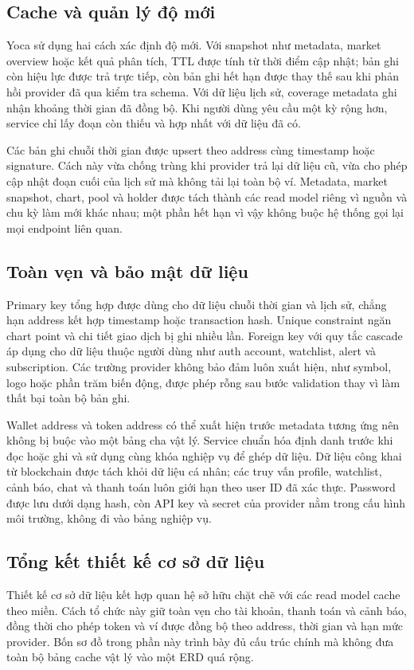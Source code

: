 \subsection{Cache và quản lý độ mới}
\label{subsec:db_cache}

Yoca sử dụng hai cách xác định độ mới. Với snapshot như metadata, market overview hoặc kết quả phân tích, TTL được tính từ thời điểm cập nhật; bản ghi còn hiệu lực được trả trực tiếp, còn bản ghi hết hạn được thay thế sau khi phản hồi provider đã qua kiểm tra schema. Với dữ liệu lịch sử, coverage metadata ghi nhận khoảng thời gian đã đồng bộ. Khi người dùng yêu cầu một kỳ rộng hơn, service chỉ lấy đoạn còn thiếu và hợp nhất với dữ liệu đã có.

Các bản ghi chuỗi thời gian được upsert theo address cùng timestamp hoặc signature. Cách này vừa chống trùng khi provider trả lại dữ liệu cũ, vừa cho phép cập nhật đoạn cuối của lịch sử mà không tải lại toàn bộ ví. Metadata, market snapshot, chart, pool và holder được tách thành các read model riêng vì nguồn và chu kỳ làm mới khác nhau; một phần hết hạn vì vậy không buộc hệ thống gọi lại mọi endpoint liên quan.

\subsection{Toàn vẹn và bảo mật dữ liệu}
\label{subsec:db_toan_ven}

Primary key tổng hợp được dùng cho dữ liệu chuỗi thời gian và lịch sử, chẳng hạn address kết hợp timestamp hoặc transaction hash. Unique constraint ngăn chart point và chi tiết giao dịch bị ghi nhiều lần. Foreign key với quy tắc cascade áp dụng cho dữ liệu thuộc người dùng như auth account, watchlist, alert và subscription. Các trường provider không bảo đảm luôn xuất hiện, như symbol, logo hoặc phần trăm biến động, được phép rỗng sau bước validation thay vì làm thất bại toàn bộ bản ghi.

Wallet address và token address có thể xuất hiện trước metadata tương ứng nên không bị buộc vào một bảng cha vật lý. Service chuẩn hóa định danh trước khi đọc hoặc ghi và sử dụng cùng khóa nghiệp vụ để ghép dữ liệu. Dữ liệu công khai từ blockchain được tách khỏi dữ liệu cá nhân; các truy vấn profile, watchlist, cảnh báo, chat và thanh toán luôn giới hạn theo user ID đã xác thực. Password được lưu dưới dạng hash, còn API key và secret của provider nằm trong cấu hình môi trường, không đi vào bảng nghiệp vụ.


\subsection{Tổng kết thiết kế cơ sở dữ liệu}
\label{subsec:db_tong_ket}

Thiết kế cơ sở dữ liệu kết hợp quan hệ sở hữu chặt chẽ với các read model cache theo miền. Cách tổ chức này giữ toàn vẹn cho tài khoản, thanh toán và cảnh báo, đồng thời cho phép token và ví được đồng bộ theo address, thời gian và hạn mức provider. Bốn sơ đồ trong phần này trình bày đủ cấu trúc chính mà không đưa toàn bộ bảng cache vật lý vào một ERD quá rộng.
